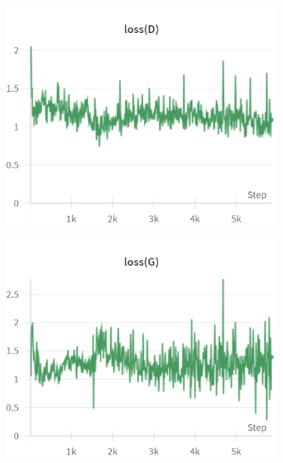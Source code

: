 \begin{figure}[H]
    \centering

    \begin{subfigure}{0.45\textwidth}
        \centering
        \includegraphics[width=0.95\linewidth]{cifar10/32/lossD.png}
        \caption{}
        \label{subfig:cifar10/32/lossD}
    \end{subfigure}%
    \begin{subfigure}{0.45\textwidth}
        \centering
        \includegraphics[width=0.95\linewidth]{cifar10/32/lossG.png}
        \caption{}
        \label{subfig:cifar10/32/lossG}
    \end{subfigure}


\end{figure}
